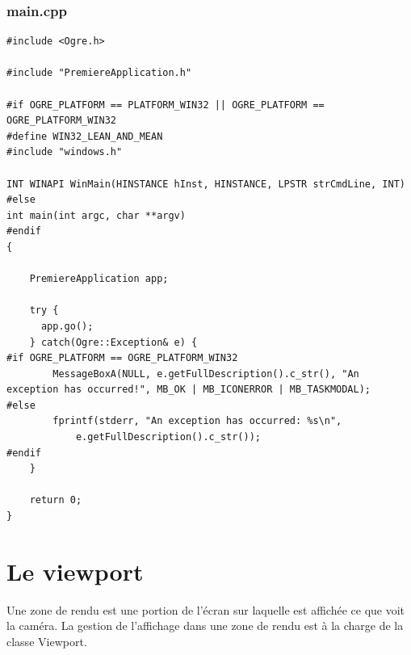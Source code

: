 \subsubsection{main.cpp}
\begin{lstlisting}[caption={main.cpp: Cr\'eation de la cam\'era}]
#include <Ogre.h>

#include "PremiereApplication.h"

#if OGRE_PLATFORM == PLATFORM_WIN32 || OGRE_PLATFORM == OGRE_PLATFORM_WIN32
#define WIN32_LEAN_AND_MEAN
#include "windows.h"

INT WINAPI WinMain(HINSTANCE hInst, HINSTANCE, LPSTR strCmdLine, INT)
#else
int main(int argc, char **argv)
#endif
{

    PremiereApplication app;
    
    try {
      app.go();
    } catch(Ogre::Exception& e) {
#if OGRE_PLATFORM == OGRE_PLATFORM_WIN32
        MessageBoxA(NULL, e.getFullDescription().c_str(), "An exception has occurred!", MB_OK | MB_ICONERROR | MB_TASKMODAL);
#else
        fprintf(stderr, "An exception has occurred: %s\n",
            e.getFullDescription().c_str());
#endif
    }

    return 0;
}
\end{lstlisting}




































\section{Le viewport}

Une zone de rendu est une portion de l'\'ecran sur laquelle est affich\'ee ce que voit la cam\'era. La gestion de l'affichage dans une zone de rendu est \`{a} la charge de la classe Viewport.

